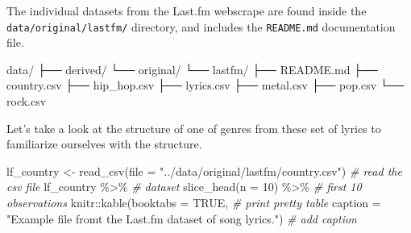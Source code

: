 \documentclass[
]{article}
\newenvironment{Shaded}{\begin{snugshade}}{\end{snugshade}}
\newcommand{\AttributeTok}[1]{\textcolor[rgb]{0.77,0.63,0.00}{#1}}
\newcommand{\CommentTok}[1]{\textcolor[rgb]{0.56,0.35,0.01}{\textit{#1}}}
\newcommand{\ConstantTok}[1]{\textcolor[rgb]{0.00,0.00,0.00}{#1}}
\newcommand{\DecValTok}[1]{\textcolor[rgb]{0.00,0.00,0.81}{#1}}
\newcommand{\ExtensionTok}[1]{#1}
\newcommand{\FunctionTok}[1]{\textcolor[rgb]{0.00,0.00,0.00}{#1}}
\newcommand{\NormalTok}[1]{#1}
\newcommand{\OtherTok}[1]{\textcolor[rgb]{0.56,0.35,0.01}{#1}}
\newcommand{\SpecialCharTok}[1]{\textcolor[rgb]{0.00,0.00,0.00}{#1}}
\newcommand{\StringTok}[1]{\textcolor[rgb]{0.31,0.60,0.02}{#1}}
\begin{document}
The individual datasets from the Last.fm webscrape are found inside the \texttt{data/original/lastfm/} directory, and includes the \texttt{README.md} documentation file.

\begin{Shaded}
\begin{Highlighting}[]
\ExtensionTok{data/}
\ExtensionTok{├──}\NormalTok{ derived/}
\ExtensionTok{└──}\NormalTok{ original/}
    \ExtensionTok{└──}\NormalTok{ lastfm/}
        \ExtensionTok{├──}\NormalTok{ README.md}
        \ExtensionTok{├──}\NormalTok{ country.csv}
        \ExtensionTok{├──}\NormalTok{ hip\_hop.csv}
        \ExtensionTok{├──}\NormalTok{ lyrics.csv}
        \ExtensionTok{├──}\NormalTok{ metal.csv}
        \ExtensionTok{├──}\NormalTok{ pop.csv}
        \ExtensionTok{└──}\NormalTok{ rock.csv}
\end{Highlighting}
\end{Shaded}

Let's take a look at the structure of one of genres from these set of lyrics to familiarize ourselves with the structure.

\begin{Shaded}
\begin{Highlighting}[]
\NormalTok{lf\_country }\OtherTok{\textless{}{-}} \FunctionTok{read\_csv}\NormalTok{(}\AttributeTok{file =} \StringTok{"../data/original/lastfm/country.csv"}\NormalTok{) }\CommentTok{\# read the csv file}
\NormalTok{lf\_country }\SpecialCharTok{\%\textgreater{}\%} \CommentTok{\# dataset}
  \FunctionTok{slice\_head}\NormalTok{(}\AttributeTok{n =} \DecValTok{10}\NormalTok{) }\SpecialCharTok{\%\textgreater{}\%} \CommentTok{\# first 10 observations }
\NormalTok{knitr}\SpecialCharTok{::}\FunctionTok{kable}\NormalTok{(}\AttributeTok{booktabs =} \ConstantTok{TRUE}\NormalTok{, }\CommentTok{\# print pretty table}
             \AttributeTok{caption =} \StringTok{"Example file fromt the Last.fm dataset of song lyrics."}\NormalTok{) }\CommentTok{\# add caption}
\end{Highlighting}
\end{Shaded}
\end{document}
